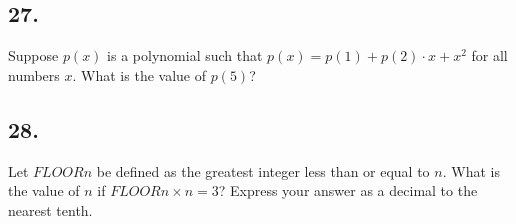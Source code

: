 \documentclass[12pt]{article}
\begin{document}
\subsection*{27.}
Suppose $p(x)$ is a polynomial such that $p(x) = p(1) + p(2) \cdot x + x^2$ for all numbers $x$. What is the value of $p(5)$?

\nopagebreak

\fbox{\phantom{ANSWER}}

\begin{answer}
%
\end{answer}


\subsection*{28.}
Let $FLOOR n$ be defined as the greatest integer less than or equal to $n$. What is the value of $n$ if $FLOOR n \times n = 3$? Express your answer as a decimal to the nearest tenth. 

\nopagebreak

\fbox{\phantom{ANSWER}}

\begin{answer}
%
\end{answer}
\end{document}
